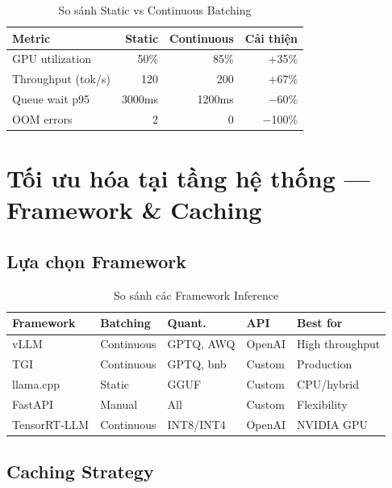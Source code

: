 \documentclass[12pt,a4paper]{report}
\begin{document}
\begin{table}[h]
\centering
\caption{So sánh Static vs Continuous Batching}
\label{tab:batching-comparison}
\begin{tabular}{lrrr}
\toprule
\textbf{Metric} & \textbf{Static} & \textbf{Continuous} & \textbf{Cải thiện} \\
\midrule
GPU utilization & 50\% & 85\% & $+$35\% \\
Throughput (tok/s) & 120 & 200 & $+$67\% \\
Queue wait p95 & 3000ms & 1200ms & $-$60\% \\
OOM errors & 2 & 0 & $-$100\% \\
\bottomrule
\end{tabular}
\end{table}

\section{Tối ưu hóa tại tầng hệ thống --- Framework \& Caching}

\subsection{Lựa chọn Framework}

\begin{table}[h]
\centering
\caption{So sánh các Framework Inference}
\label{tab:framework-comparison}
\begin{tabular}{p{2.5cm}p{2cm}p{2cm}p{2.5cm}p{2.5cm}}
\toprule
\textbf{Framework} & \textbf{Batching} & \textbf{Quant.} & \textbf{API} & \textbf{Best for} \\
\midrule
vLLM & Continuous & GPTQ, AWQ & OpenAI & High throughput \\
TGI & Continuous & GPTQ, bnb & Custom & Production \\
llama.cpp & Static & GGUF & Custom & CPU/hybrid \\
FastAPI & Manual & All & Custom & Flexibility \\
TensorRT-LLM & Continuous & INT8/INT4 & OpenAI & NVIDIA GPU \\
\bottomrule
\end{tabular}
\end{table}

\subsection{Caching Strategy}
\end{document}
